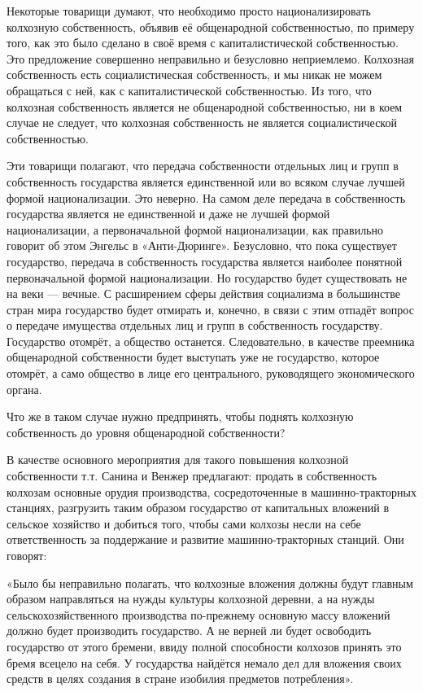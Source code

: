 \documentclass[12pt, a4paper, openany]{book}
\begin{document}
Некоторые товарищи думают, что необходимо просто национализировать колхозную собственность, объявив её общенародной собственностью, по примеру того, как это было сделано в своё время с капиталистической собственностью. Это предложение совершенно неправильно и безусловно неприемлемо. Колхозная собственность есть социалистическая собственность, и мы никак не можем обращаться с ней, как с капиталистической собственностью. Из того, что колхозная собственность является не общенародной собственностью, ни в коем случае не следует, что колхозная собственность не является социалистической собственностью.



Эти товарищи полагают, что передача собственности отдельных лиц и групп в собственность государства является единственной или во всяком случае лучшей формой национализации. Это неверно. На самом деле передача в собственность государства является не единственной и даже не лучшей формой национализации, а первоначальной формой национализации, как правильно говорит об этом Энгельс в «Анти-Дюринге». Безусловно, что пока существует государство, передача в собственность государства является наиболее понятной первоначальной формой национализации. Но государство будет существовать не на веки — вечные. С расширением сферы действия социализма в большинстве стран мира государство будет отмирать и, конечно, в связи с этим отпадёт вопрос о передаче имущества отдельных лиц и групп в собственность государству. Государство отомрёт, а общество останется. Следовательно, в качестве преемника общенародной собственности будет выступать уже не государство, которое отомрёт, а само общество в лице его центрального, руководящего экономического органа.



Что же в таком случае нужно предпринять, чтобы поднять колхозную собственность до уровня общенародной собственности?



В качестве основного мероприятия для такого повышения колхозной собственности т.т. Санина и Венжер предлагают: продать в собственность колхозам основные орудия производства, сосредоточенные в машинно-тракторных станциях, разгрузить таким образом государство от капитальных вложений в сельское хозяйство и добиться того, чтобы сами колхозы несли на себе ответственность за поддержание и развитие машинно-тракторных станций. Они говорят:



«Было бы неправильно полагать, что колхозные вложения должны будут главным образом направляться на нужды культуры колхозной деревни, а на нужды сельскохозяйственного производства по-прежнему основную массу вложений должно будет производить государство. А не верней ли будет освободить государство от этого бремени, ввиду полной способности колхозов принять это бремя всецело на себя. У государства найдётся немало дел для вложения своих средств в целях создания в стране изобилия предметов потребления».
\end{document}
